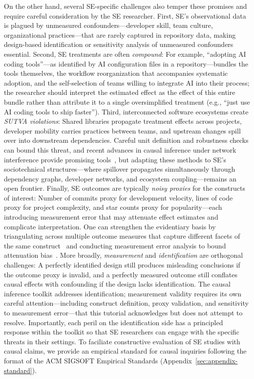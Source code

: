 On the other hand, several SE-specific challenges also temper these promises and require careful consideration by the SE researcher.
First, SE's observational data is plagued by unmeasured confounders---developer skill, team culture, organizational practices---that are rarely captured in repository data, making design-based identification or sensitivity analysis of unmeasured confounders essential.
Second, SE treatments are often \emph{compound}: For example, ``adopting AI coding tools''---as identified by AI configuration files in a repository---bundles the tools themselves, the workflow reorganization that accompanies systematic adoption, and the self-selection of teams willing to integrate AI into their process; the researcher should interpret the estimated effect as the effect of this entire bundle rather than attribute it to a single oversimplified treatment (e.g., ``just use AI coding tools to ship faster'').
Third, interconnected software ecosystems create \emph{SUTVA violations}: Shared libraries propagate treatment effects across projects, developer mobility carries practices between teams, and upstream changes spill over into downstream dependencies.
Careful unit definition and robustness checks can bound this threat, and recent advances in causal inference under network interference provide promising tools~\cite{savje2021average, forastiere2021identification}, but adapting these methods to SE's sociotechnical structures---where spillover propagates simultaneously through dependency graphs, developer networks, and ecosystem coupling---remains an open frontier.
Finally, SE outcomes are typically \emph{noisy proxies} for the constructs of interest: Number of commits proxy for development velocity, lines of code proxy for project complexity, and star counts proxy for popularity---each introducing measurement error that may attenuate effect estimates and complicate interpretation.
One can strengthen the evidentiary basis by triangulating across multiple outcome measures that capture different facets of the same construct~\cite{lawlor2016triangulation} and conducting measurement error analysis to bound attenuation bias~\cite{hausman2001mismeasured}.
More broadly, \emph{measurement} and \emph{identification} are orthogonal challenges: A perfectly identified design still produces misleading conclusions if the outcome proxy is invalid, and a perfectly measured outcome still conflates causal effects with confounding if the design lacks identification.
The causal inference toolkit addresses identification; measurement validity requires its own careful attention---including construct definition, proxy validation, and sensitivity to measurement error---that this tutorial acknowledges but does not attempt to resolve.
Importantly, each peril on the identification side has a principled response within the toolkit so that SE researchers can engage with the specific threats in their settings.
To faciliate constructive evaluation of SE studies with causal claims, we provide an empirical standard for causal inquiries following the format of the ACM SIGSOFT Empirical Standards (Appendix~\ref{sec:appendix-standard}).
